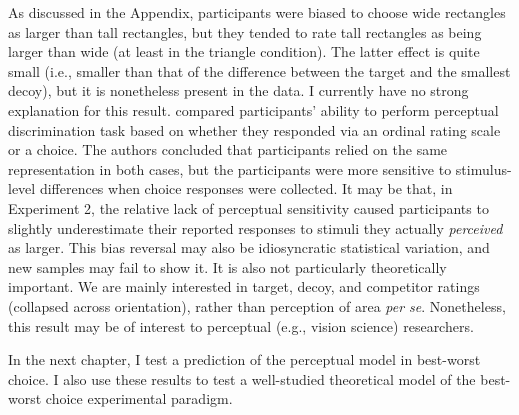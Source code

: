 As discussed in the Appendix, participants were biased to choose wide rectangles as larger than tall rectangles, but they tended to rate tall rectangles as being larger than wide (at least in the triangle condition). The latter effect is quite small (i.e., smaller than that of the difference between the target and the smallest decoy), but it is nonetheless present in the data. I currently have no strong explanation for this result. \textcite{gronau2023choice} compared participants' ability to perform perceptual discrimination task based on whether they responded via an ordinal rating scale or a choice. The authors concluded that participants relied on the same representation in both cases, but the participants were more sensitive to stimulus-level differences when choice responses were collected. It may be that, in Experiment 2, the relative lack of perceptual sensitivity caused participants to slightly underestimate their reported responses to stimuli they actually \textit{perceived} as larger. This bias reversal may also be idiosyncratic statistical variation, and new samples may fail to show it. It is also not particularly theoretically important. We are mainly interested in target, decoy, and competitor ratings (collapsed across orientation), rather than perception of area \textit{per se}. Nonetheless, this result may be of interest to perceptual (e.g., vision science) researchers.

In the next chapter, I test a prediction of the perceptual model in best-worst choice. I also use these results to test a well-studied theoretical model of the best-worst choice experimental paradigm.
